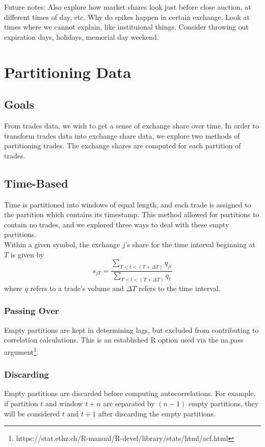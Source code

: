 \documentclass{article}
\begin{document}
Future notes: Also explore how market shares look just before close auction, at different times of day, etc. Why do spikes happen in certain exchange. Look at times where we cannot explain, like instituional things. Consider throwing out expiration days, holidays, memorial day weekend.\\		

\section{Partitioning Data}
\subsection{Goals}
From trades data, we wish to get a sense of exchange share over time. In order to transform trades data into exchange share data, we explore two methods of partitioning trades. The exchange shares are computed for each partition of trades.\\

\subsection{Time-Based}
Time is partitioned into windows of equal length, and each trade is assigned to the partition which contains its timestamp. This method allowed for partitions to contain no trades, and we explored three ways to deal with these empty partitions.\\

Within a given symbol, the exchange $j$'s share for the time interval beginning at $T$ is given by
$$s_{jT} = \frac{\sum_{T\underline{<}t < (T+\Delta T)} q_{jt}}{\sum_{T\underline{<}t < (T+\Delta T)}q_{t}}$$
where $q$ refers to a trade's volume and $\Delta T$ refers to the time interval.\\

\subsubsection{Passing Over} \label{passoverempty}
Empty partitions are kept in determining lags, but excluded from contributing to correlation calculations. This is an established R option used via the na.pass argument\footnote{https://stat.ethz.ch/R-manual/R-devel/library/stats/html/acf.html}.\\

\subsubsection{Discarding} \label{discardempty}
Empty partitions are discarded before computing autocorrelations. For example, if partition $t$ and window $t + n$ are separated by $(n - 1)$ empty partitions, they will be considered $t$ and $t + 1$ after discarding the empty partitions.\\
\end{document}
